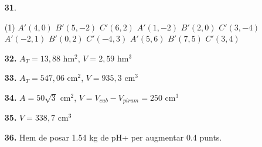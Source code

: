 \documentclass[a4paper, pdf, twoside]{book}
\begin{document}
\begin{multicols}{2}
\begin{enumerate}

 \item[\fontfamily{phv}\selectfont\color{blue}\textbf{31}. ]  \scalebox{0.6}{\simbolclau } 
 \begin{tasks}[column-sep=1em, item-indent=1.3333em](1)
	 \task $A'(4,0)$ $B'(5,-2)$ $C'(6,2)$
	 \task* $A'(1,-2)$ $B'(2,0)$ $C'(3,-4)$
	 \task* $A'(-2,1)$ $B'(0,2)$ $C'(-4,3)$
	 \task $A'(5,6)$ $B'(7,5)$ $C'(3,4)$
\end{tasks}
 \end{enumerate}
\begin{enumerate}
\vspace{0.25cm}
\item[\fontfamily{phv}\selectfont\color{blue}\textbf{32. }]  \scalebox{0.6}{\simbolclau } 
$A_T =13,88$ hm$^{2}$, $V=2,59$ hm$^3$
\vspace{0.25cm}
\item[\fontfamily{phv}\selectfont\color{blue}\textbf{33. }]  \scalebox{0.6}{\simbolclau } 
$A_T =547,06$ cm$^{2}$, $V=935,3$ cm$^3$
\vspace{0.25cm}
\item[\fontfamily{phv}\selectfont\color{blue}\textbf{34. }]  \scalebox{0.6}{\simbolclau } 
$A=50\sqrt {3}$ cm$^{2}$, $V=V_{cub} -V_{piram}=250$ cm$^{3}$
\vspace{0.25cm}
\item[\fontfamily{phv}\selectfont\color{blue}\textbf{35. }]  \scalebox{0.6}{\simbolclau } 
$V=338,7$ cm$^3$
\vspace{0.25cm}
\item[\fontfamily{phv}\selectfont\color{blue}\textbf{36. }]  \scalebox{0.6}{\simbolclau } 
Hem de posar 1.54 kg de pH+ per augmentar 0.4 punts.
 \end{enumerate}
\end{multicols}
\end{document}
